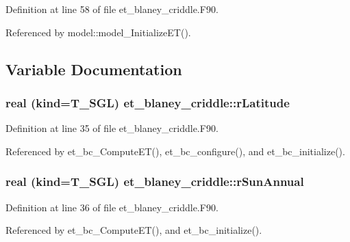 Definition at line 58 of file et\_\-blaney\_\-criddle.F90.



Referenced by model::model\_\-InitializeET().



\subsection{Variable Documentation}
\hypertarget{namespaceet__blaney__criddle_abf5bb3e13dbddedbfd78a519afe53b73}{
\subsubsection[{rLatitude}]{\setlength{\rightskip}{0pt plus 5cm}real (kind=T\_\-SGL) {\bf et\_\-blaney\_\-criddle::rLatitude}}}
\label{namespaceet__blaney__criddle_abf5bb3e13dbddedbfd78a519afe53b73}


Definition at line 35 of file et\_\-blaney\_\-criddle.F90.



Referenced by et\_\-bc\_\-ComputeET(), et\_\-bc\_\-configure(), and et\_\-bc\_\-initialize().

\hypertarget{namespaceet__blaney__criddle_a6cb99bb829eb26317eecf0d938c1f69a}{
\subsubsection[{rSunAnnual}]{\setlength{\rightskip}{0pt plus 5cm}real (kind=T\_\-SGL) {\bf et\_\-blaney\_\-criddle::rSunAnnual}}}
\label{namespaceet__blaney__criddle_a6cb99bb829eb26317eecf0d938c1f69a}


Definition at line 36 of file et\_\-blaney\_\-criddle.F90.



Referenced by et\_\-bc\_\-ComputeET(), and et\_\-bc\_\-initialize().

